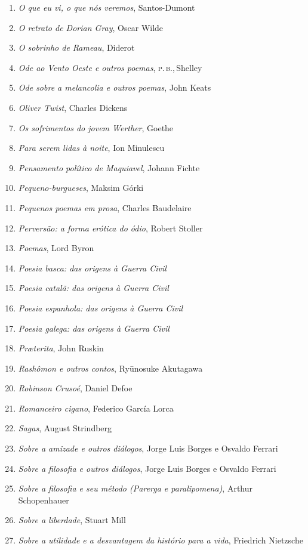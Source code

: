 \begin{enumerate}
\item \textit{O que eu vi, o que nós veremos}, Santos-Dumont
\item \textit{O retrato de Dorian Gray}, Oscar Wilde
\item \textit{O sobrinho de Rameau}, Diderot
\item \textit{Ode ao Vento Oeste e outros poemas}, \textsc{p.\,b.},\,Shelley
\item \textit{Ode sobre a melancolia e outros poemas}, John Keats
\item \textit{Oliver Twist}, Charles Dickens
\item \textit{Os sofrimentos do jovem Werther}, Goethe
\item \textit{Para serem lidas à noite}, Ion Minulescu
\item \textit{Pensamento político de Maquiavel}, Johann Fichte
\item \textit{Pequeno-burgueses}, Maksim Górki
\item \textit{Pequenos poemas em prosa}, Charles Baudelaire
\item \textit{Perversão: a forma erótica do ódio}, Robert Stoller
\item \textit{Poemas}, Lord Byron
\item \textit{Poesia basca: das origens à Guerra Civil} 
\item \textit{Poesia catalã: das origens à Guerra Civil} 
\item \textit{Poesia espanhola: das origens à Guerra Civil} 
\item \textit{Poesia galega: das origens à Guerra Civil} 
\item \textit{Pr\ae terita}, John Ruskin
\item \textit{Rashômon e outros contos}, Ryūnosuke Akutagawa
\item \textit{Robinson Crusoé}, Daniel Defoe
\item \textit{Romanceiro cigano}, Federico García Lorca
\item \textit{Sagas}, August Strindberg
\item \textit{Sobre a amizade e outros diálogos}, Jorge Luis Borges e Osvaldo Ferrari
\item \textit{Sobre a filosofia e outros diálogos}, Jorge Luis Borges e Osvaldo Ferrari
\item \textit{Sobre a filosofia e seu método (Parerga e paralipomena)}, Arthur Schopenhauer 
\item \textit{Sobre a liberdade}, Stuart Mill
\item \textit{Sobre a utilidade e a desvantagem da histório para a vida}, Friedrich Nietzsche

\end{enumerate}
